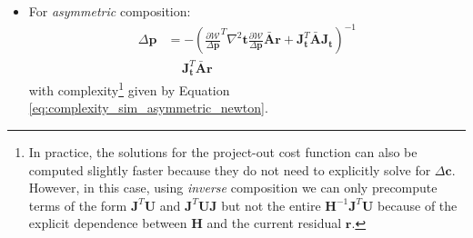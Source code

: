 \begin{itemize}
	\item For \emph{asymmetric} composition:
	\begin{equation}
	    \begin{aligned}
	        \Delta \mathbf{p} & = -\left( \frac{\partial \mathcal{W}}{\Delta \mathbf{p}}^T \nabla^2\mathbf{t} \frac{\partial \mathcal{W}}{\Delta \mathbf{p}}\bar{\mathbf{A}}\mathbf{r} + \mathbf{J}_{\mathbf{t}}^T\bar{\mathbf{A}}\mathbf{J}_{\mathbf{t}} \right)^{-1}
	        \\
	        & \quad \, \mathbf{J}_{\mathbf{t}}^T\bar{\mathbf{A}}\mathbf{r}
	    \label{eq:asymmetric_newton_po_solution}
	    \end{aligned}
	\end{equation}
	with complexity\footnote{\label{foot:ic_newton}In practice, the solutions for the project-out cost function can also be computed slightly faster because they do not need to explicitly solve for $\Delta\mathbf{c}$. However, in this case, using \emph{inverse} composition we can only precompute terms of the form $\mathbf{J}^T\mathbf{U}$ and  $\mathbf{J}^T\mathbf{U}\mathbf{J}$ but not the entire $\mathbf{H}^{-1}\mathbf{J}^T\mathbf{U}$ because of the explicit dependence between $\mathbf{H}$ and the current residual $\mathbf{r}$.} given by Equation \ref{eq:complexity_sim_asymmetric_newton}.


\end{itemize}
